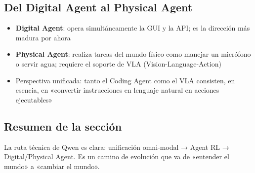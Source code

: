 \subsection{Del Digital Agent al Physical Agent}

\begin{itemize}
    \item \textbf{Digital Agent}: opera simultáneamente la GUI y la API; es la dirección más madura por ahora
    \item \textbf{Physical Agent}: realiza tareas del mundo físico como manejar un micrófono o servir agua; requiere el soporte de VLA (Vision-Language-Action)
    \item Perspectiva unificada: tanto el Coding Agent como el VLA consisten, en esencia, en «convertir instrucciones en lenguaje natural en acciones ejecutables»
\end{itemize}

\subsection{Resumen de la sección}

La ruta técnica de Qwen es clara: unificación omni-modal → Agent RL → Digital/Physical Agent. Es un camino de evolución que va de «entender el mundo» a «cambiar el mundo».

